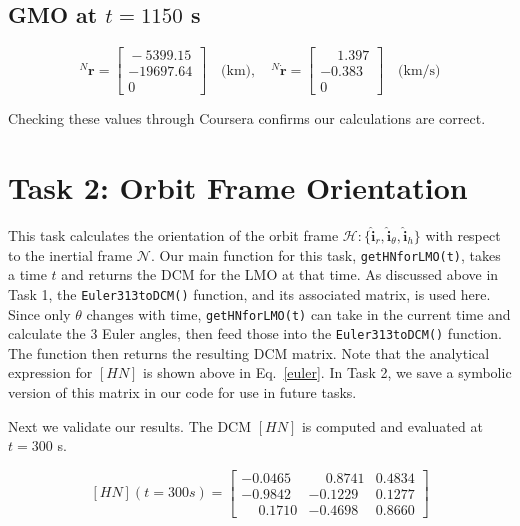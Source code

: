 \documentclass[conf]{new-aiaa}
\begin{document}
\subsection*{GMO at $t = 1150$ s}
\[
{}^N{\bm{r}} = 
\begin{bmatrix}
\phantom{}-5399.15 \\ -19697.64 \\ 0
\end{bmatrix} \quad \text{(km)}, \quad
{}^N\dot{\bm{r}} = 
\begin{bmatrix}
\phantom{-}1.397 \\ -0.383 \\ 0
\end{bmatrix} \quad \text{(km/s)}
\]

Checking these values through Coursera confirms our calculations are correct.
















\section{Task 2: Orbit Frame Orientation}
This task calculates the orientation of the orbit frame $\mathcal{H} : \{\hat{\bm{i}}_r, \hat{\bm{i}}_{\theta}, \hat{\bm{i}}_h\}$ with respect to the inertial frame \(\mathcal{N}\). Our main function for this task, \texttt{getHNforLMO(t)}, takes a time $t$ and returns the DCM for the LMO at that time. As discussed above in Task 1, the \texttt{Euler313toDCM()} function, and its associated matrix, is used here. Since only $\theta$ changes with time, \texttt{getHNforLMO(t)} can take in the current time and calculate the 3 Euler angles, then feed those into the \texttt{Euler313toDCM()} function. The function then returns the resulting DCM matrix. Note that the analytical expression for $[HN]$ is shown above in Eq.~\eqref{euler}. In Task 2, we save a symbolic version of this matrix in our code for use in future tasks. 

Next we validate our results. The DCM $[HN]$ is computed and evaluated at $t = 300$ s.

\[
[HN](t = 300s) = 
\begin{bmatrix}
-0.0465 & \phantom{-}0.8741 & 0.4834 \\
-0.9842 & -0.1229 & 0.1277 \\
\phantom{-}0.1710 & -0.4698 & 0.8660
\end{bmatrix}
\]
\end{document}
